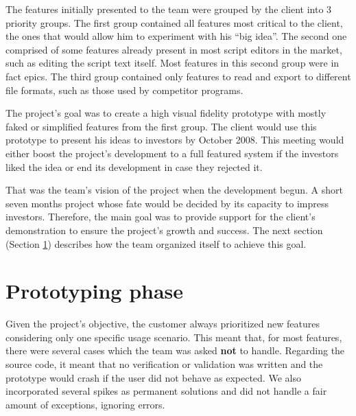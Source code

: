 \documentclass[lnbip]{svmultln}
\begin{document}

The features initially presented to the team were grouped by the
client into 3 priority groups. The first group contained all features
most critical to the client, the ones that would allow him to
experiment with his ``big idea''. The second one comprised of some
features already present in most script editors in the market, such as
editing the script text itself. Most features in this second group
were in fact epics. The third group contained only features to read
and export to different file formats, such as those used by competitor
programs.

The project's goal was to create a high visual fidelity prototype with
mostly faked or simplified features from the first group. The client
would use this prototype to present his ideas to investors by October
2008. This meeting would either boost the project's development to a
full featured system if the investors liked the idea or end its
development in case they rejected it.

That was the team's vision of the project when the development
begun. A short seven months project whose fate would be decided by its
capacity to impress investors. Therefore, the main goal was to provide
support for the client's demonstration to ensure the project's growth
and success. The next section (Section \ref{sec:working}) describes
how the team organized itself to achieve this goal.

\section{Prototyping phase}
\label{sec:working}

Given the project's objective, the customer always prioritized new
features considering only one specific usage scenario. This meant
that, for most features, there were several cases which the team was
asked \textbf{not} to handle. Regarding the source code, it meant that
no verification or validation was written and the prototype would
crash if the user did not behave as expected. We also incorporated
several spikes as permanent solutions and did not handle a fair amount
of exceptions, ignoring errors.
\end{document}
